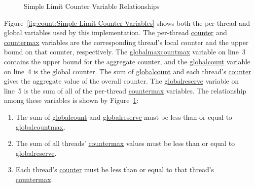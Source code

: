 \begin{figure}[tb]
\begin{center}
\end{center}
\caption{Simple Limit Counter Variable Relationships}
\label{fig:count:Simple Limit Counter Variable Relationships}
\end{figure}

Figure~\ref{fig:count:Simple Limit Counter Variables}
shows both the per-thread and global variables used by this
implementation.
The per-thread \url{counter} and \url{countermax} variables are the
corresponding thread's local counter and the upper bound on that
counter, respectively.
The \url{globalmaxcountmax} variable on line~3 contains the upper
bound for the aggregate counter, and the \url{globalcount} variable
on line~4 is the global counter.
The sum of \url{globalcount} and each thread's \url{counter} gives
the aggregate value of the overall counter.
The \url{globalreserve} variable on line~5 is the sum of all of the
per-thread \url{countermax} variables.
The relationship among these variables is shown by
Figure~\ref{fig:count:Simple Limit Counter Variable Relationships}:
\begin{enumerate}
\item	The sum of \url{globalcount} and \url{globalreserve} must
	be less than or equal to \url{globalcountmax}.
\item	The sum of all threads' \url{countermax} values must be
	less than or equal to \url{globalreserve}.
\item	Each thread's \url{counter} must be less than or equal to
	that thread's \url{countermax}.
\end{enumerate}

